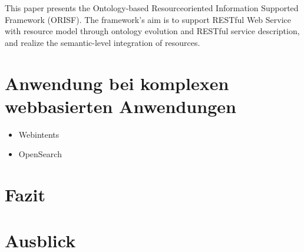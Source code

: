 \documentclass[10pt,a4paper]{article}
\begin{document}
This paper presents the Ontology-based Resourceoriented
Information Supported Framework (ORISF). The
framework’s aim is to support RESTful Web Service with
resource model through ontology evolution and RESTful
service description, and realize the semantic-level
integration of resources. \cite{zg-ontorest}

\section{Anwendung bei komplexen webbasierten Anwendungen}
\label{l:verwendung}


\begin{itemize}
\item Webintents
\item OpenSearch
\end{itemize}

\section{Fazit}
\label{l:fazit}
\section{Ausblick}
\label{l:ausblick}
\pagebreak


\end{document}
